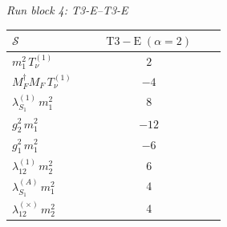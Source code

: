 \documentclass[9pt]{article}
\begin{document}
\textit{Run block 4: T3-E--T3-E}
\begin{longtable}{@{}p{0.31\linewidth}c@{}}
\toprule
$\mathcal{S}$ & $ \mathrm{T3-E}\;(\alpha=2) $ \\
\midrule
$ m_1^{2}\,T_{\nu}^{(1)} $ & $ 2 $ \\
$ M_F^\dagger M_F\,T_{\nu}^{(1)} $ & $ -4 $ \\
$ \lambda_{S_1}^{(1)}\,m_1^{2} $ & $ 8 $ \\
$ g_2^2\,m_1^{2} $ & $ -12 $ \\
$ g_1^2\,m_1^{2} $ & $ -6 $ \\
$ \lambda_{12}^{(1)}\,m_2^{2} $ & $ 6 $ \\
$ \lambda_{S_1}^{(A)}\,m_1^{2} $ & $ 4 $ \\
$ \lambda_{12}^{(\times)}\,m_2^{2} $ & $ 4 $ \\
\bottomrule
\end{longtable}
\end{document}

